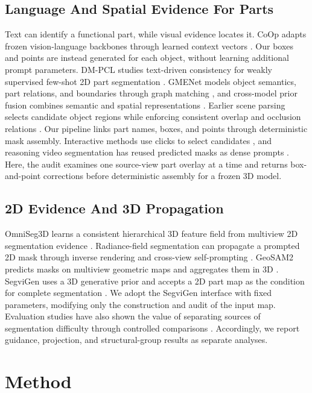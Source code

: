 \documentclass[pdflatex,iicol,sn-apa]{sn-jnl}
\begin{document}
\subsection{Language And Spatial Evidence For Parts}
Text can identify a functional part, while visual evidence locates it. CoOp adapts frozen vision-language backbones through learned context vectors \citep{zhou2022coop}. Our boxes and points are instead generated for each object, without learning additional prompt parameters. DM-PCL studies text-driven consistency for weakly supervised few-shot 2D part segmentation \citep{han2025dmpcl}. GMENet models object semantics, part relations, and boundaries through graph matching \citep{michieli2022gmenet}, and cross-model prior fusion combines semantic and spatial representations \citep{zhao2026cmpf}. Earlier scene parsing selects candidate object regions while enforcing consistent overlap and occlusion relations \citep{tighe2015sceneparsing}. Our pipeline links part names, boxes, and points through deterministic mask assembly. Interactive methods use clicks to select candidates \citep{jain2019click}, and reasoning video segmentation has reused predicted masks as dense prompts \citep{dang2025decoupled}. Here, the audit examines one source-view part overlay at a time and returns box-and-point corrections before deterministic assembly for a frozen 3D model.

\subsection{2D Evidence And 3D Propagation}
OmniSeg3D learns a consistent hierarchical 3D feature field from multiview 2D segmentation evidence \citep{ying2024omniseg3d}.
Radiance-field segmentation can propagate a prompted 2D mask through inverse rendering and cross-view self-prompting \citep{cen2025sa3d}. GeoSAM2 predicts masks on multiview geometric maps and aggregates them in 3D \citep{deng2025geosam2}. SegviGen uses a 3D generative prior and accepts a 2D part map as the condition for complete segmentation \citep{li2026segvigen}. We adopt the SegviGen interface with fixed parameters, modifying only the construction and audit of the input map. Evaluation studies have also shown the value of separating sources of segmentation difficulty through controlled comparisons \citep{yang2024benchmark}. Accordingly, we report guidance, projection, and structural-group results as separate analyses.

\section{Method}
\label{sec:method}
\end{document}
